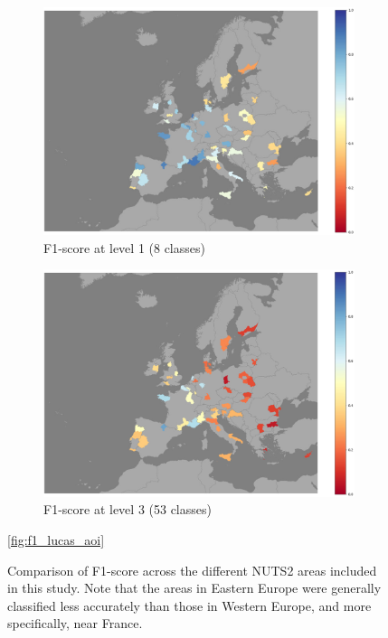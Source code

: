     \begin{figure}
    \begin{subfigure}[b]{width=0.48\linewidth}
        \centering
        \includegraphics[width=1\linewidth]{figs_05/f1_lvl1.png}
        \caption{F1-score at level 1 (8 classes)}
        \label{fig:f1_lvl1}
    \end{subfigure}
    \hfill
    \begin{subfigure}[b]{width=0.48\linewidth}
        \centering
        \includegraphics[width=1\linewidth]{figs_05/f1_lvl3.png}
        \caption{F1-score at level 3 (53 classes)}
        \label{fig:f1_lvl1}
    \end{subfigure}
    \ref{fig:f1_lucas_aoi}
    \caption{Comparison of F1-score across the different NUTS2 areas included in this study. Note that the areas in Eastern Europe were generally classified less accurately than those in Western Europe, and more specifically, near France.}
    \end{figure}

